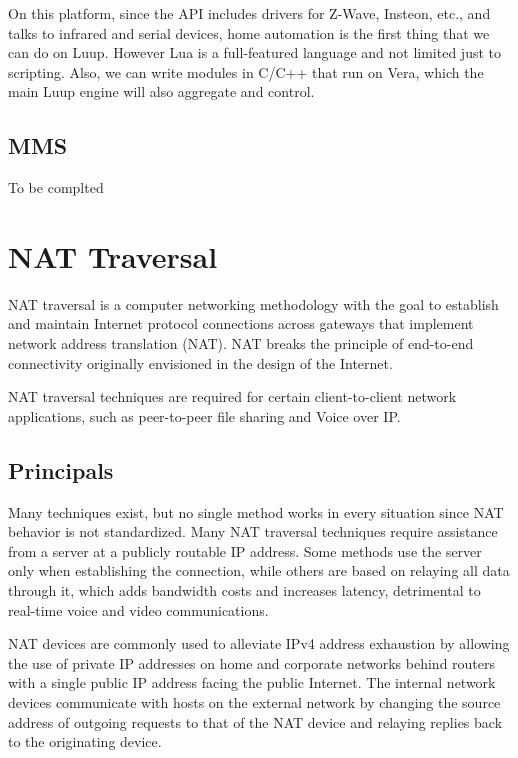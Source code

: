 On this platform, since the API includes drivers for Z-Wave, Insteon, etc., and talks to infrared and serial devices, home automation is the first thing that we can do on Luup. However Lua is a full-featured language and not limited just to scripting. Also, we can write modules in C/C++ that run on Vera, which the main Luup engine will also aggregate and control.

\subsection{MMS}
To be complted
\section{NAT Traversal}
NAT traversal is a computer networking methodology with the goal to establish and maintain Internet protocol connections across gateways that implement network address translation (NAT). NAT breaks the principle of end-to-end connectivity originally envisioned in the design of the Internet.

NAT traversal techniques are required for certain client-to-client network applications, such as peer-to-peer file sharing and Voice over IP.\cite{stiemerling2008nat}


\subsection{Principals}

Many techniques exist, but no single method works in every situation since NAT behavior is not standardized. Many NAT traversal techniques require assistance from a server at a publicly routable IP address\cite{rosenberg2003stun}. Some methods use the server only when establishing the connection, while others are based on relaying all data through it, which adds bandwidth costs and increases latency, detrimental to real-time voice and video communications.

NAT devices are commonly used to alleviate IPv4 address exhaustion\cite{alqahtaniipv4} by allowing the use of private IP addresses on home and corporate networks behind routers with a single public IP address facing the public Internet. The internal network devices communicate with hosts on the external network by changing the source address of outgoing requests to that of the NAT device and relaying replies back to the originating device.
